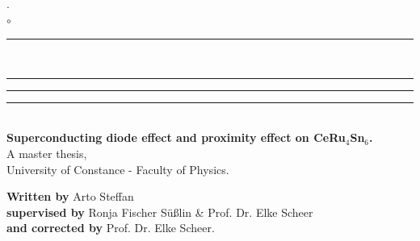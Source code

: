 \documentclass[../main.tex]{subfiles}
\begin{document}
\thispagestyle{empty}
\begin{center}
        \noindent\Huge.\\
    \noindent$\circ$\\
    \rule{0.1\textwidth}{0.75pt}\\
    \rule[20pt]{0.17\textwidth}{0.75pt} \rule[20pt]{0.5\textwidth}{0.75pt} \rule[20pt]{0.17\textwidth}{0.75pt}\\
    \vspace*{30pt}
\Huge \textbf{Superconducting diode effect and proximity effect on CeRu$_4$Sn$_6$.}\\

\vspace{48pt}
\small
A master thesis,\\
University of Constance - Faculty of Physics. 
\end{center}
\textbf{Written by} Arto Steffan \\
\textbf{supervised by} Ronja Fischer Süßlin \& Prof. Dr. Elke Scheer\\
\textbf{and corrected by} Prof. Dr. Elke Scheer.
\vspace{80pt}
\end{document}

